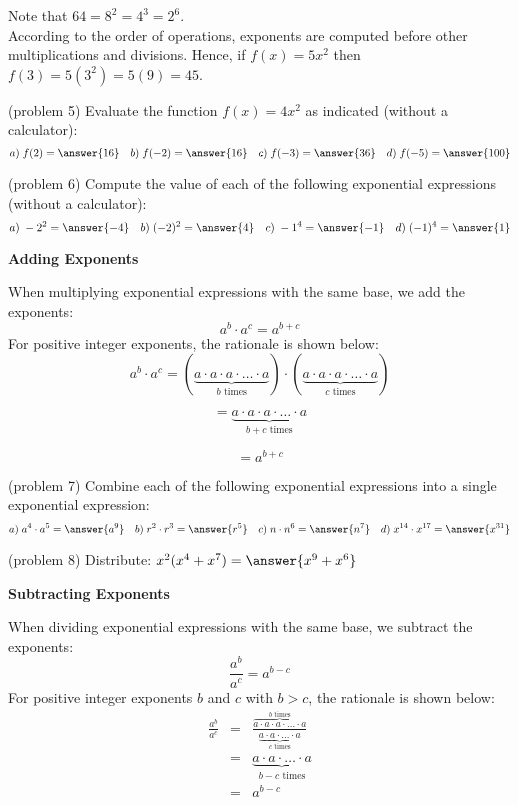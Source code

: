\documentclass[handout]{ximera}
\begin{document}
Note that $64 = 8^2 = 4^3 = 2^6$.\\

According to the order of operations, exponents are computed before other 
multiplications and divisions. Hence, if $f(x) = 5x^2$ then $f(3) = 5(3^2) = 5(9) = 45$.

\begin{problem}(problem 5)
Evaluate the function $f(x) = 4x^2$ as indicated (without a calculator):
\[
a) \;f(2) = \answer{16} \quad b) \;f(-2) = \answer{16} \quad c) \;f(-3) = \answer{36} \quad d) \;f(-5) = \answer{100}
\]
\end{problem}

\begin{problem}(problem 6)
Compute the value of each of the following exponential expressions (without a calculator):
\[
a) \;-2^2 = \answer{-4} \quad b) \;(-2)^2 = \answer{4} \quad c) \;-1^4 = \answer{-1} \quad d) \;(-1)^4 = \answer{1}
\]
\end{problem}

\begin{center}
\textbf{Adding Exponents}
\end{center}
When multiplying exponential expressions with the same base, we add the exponents:
\[
a^b \cdot a^c = a^{b+c}
\] 
For positive integer exponents, the rationale is shown below:
\[
a^b \cdot a^c = (\underbrace{a \cdot a \cdot a \cdot \ldots \cdot a}_\text{$b$ times}) \cdot
(\underbrace{a \cdot a \cdot a \cdot \ldots \cdot a}_\text{$c$ times})
\]

\[
= \underbrace{a \cdot a \cdot a \cdot \ldots \cdot a}_\text{$b+c$ times}
\]

\[
= a^{b+c}
\]

\begin{problem}(problem 7)
Combine each of the following exponential expressions into a single exponential expression:
\[
a) \;a^4\cdot a^5 = \answer{a^9} \quad b) \;r^2 \cdot r^3  = \answer{r^5} \quad c) \;n\cdot n^6 = \answer{n^7} 
\quad d) \;x^{14}\cdot x^{17} = \answer{x^{31}}
\]
\end{problem}


\begin{problem}(problem 8)
Distribute: $x^2(x^4 + x^7)  = \answer{x^9+x^6}$
\end{problem}


\begin{center}
\textbf{Subtracting Exponents}
\end{center}
When dividing exponential expressions with the same base, we subtract the exponents:
\[
\frac{a^b}{a^c} = a^{b-c}
\] 
For positive integer exponents $b$ and $c$ with $b > c$, the rationale is shown below:
\begin{eqnarray*}
\frac{a^b}{a^c} &=& \frac{\overbrace{a \cdot a \cdot a \cdot \ldots \cdot a}^\text{$b$ times}}
{\underbrace{ a \cdot a \cdot \ldots \cdot a}_\text{$c$ times}}\\[10pt]
&=& \underbrace{ a \cdot a \cdot \ldots \cdot a}_\text{$b-c$ times}\\[10pt]
&=& a^{b-c}
\end{eqnarray*}
\end{document}
